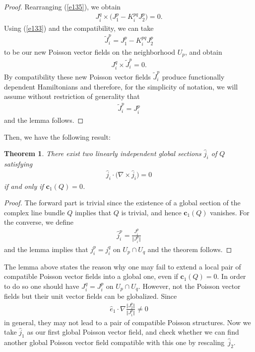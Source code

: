 \documentclass[pdftex]{sigma}
\numberwithin{equation}{section}
\newtheorem{Theorem}{Theorem}[section]
\begin{document}
\begin{proof}
Rearranging (\ref{e135}), we obtain
\begin{gather*}
J_{i}^{q}\times \big( J_{1}^{p}-K_{i}^{pq}J_{2}^{p}\big) =0.
\end{gather*}
Using (\ref{e133}) and the compatibility, we can take
\begin{gather*}
\widetilde{J}_{i}^{p}=J_{1}^{p}-K_{i}^{pq}J_{2}^{p}
\end{gather*}
to be our new Poisson vector f\/ields on the neighborhood $U_{p}$, and obtain
\begin{gather*}
J_{i}^{q}\times \widetilde{J}_{i}^{p}=0.
\end{gather*}
By compatibility these new Poisson vector f\/ields $\widetilde{J}_{i}^{p}$ produce functionally dependent Hamilto\-nians and therefore, for the simplicity of notation, we will assume without restriction of generality that
\begin{gather*}
\widetilde{J}_{i}^{p}=J_{i}^{p}
\end{gather*}
and the lemma follows.
\end{proof}

Then, we have the following result:

\begin{Theorem}\label{theorem3}
There exist two linearly independent global sections $\widehat{j}_{i}$ of $Q$ satisfying
\begin{gather}
\widehat{j}_{i}\cdot \big( \nabla \times \widehat{j}_{i}\big) =0\label{e140}
\end{gather}
if and only if $\boldsymbol{c}_{1}(Q) =0$.
\end{Theorem}

\begin{proof}
The forward part is trivial since the existence of a global section of the complex line bundle $Q$ implies that $Q$ is trivial, and hence $\boldsymbol{c}_{1}(Q) $ vanishes. For the converse, we def\/ine
\begin{gather*}
\widehat{j}_{i}^{p}=\frac{J_{i}^{p}}{\big\Vert J_{i}^{p}\big\Vert }
\end{gather*}
and the lemma implies that $j_{i}^{p}=j_{i}^{q}$ on $U_{p}\cap U_{q}$ and the theorem follows.
\end{proof}

The lemma above states the reason why one may fail to extend a local pair of compatible Poisson vector f\/ields into a global one, even if $\boldsymbol{c}_{1}(Q) =0$. In order to do so one should have $J_{i}^{q}=J_{i}^{p}$ on $U_{p}\cap U_{q}$. However, not the Poisson vector f\/ields but their unit vector f\/ields can be globalized. Since
\begin{gather*}
\widehat{e}_{1}\cdot \nabla \frac{\big\Vert J_{2}^{p}\big\Vert }{\big\Vert J_{1}^{p}\big\Vert }\neq 0 %
\end{gather*}
in general, they may not lead to a pair of compatible Poisson structures. Now we take $\widehat{j}_{1}$ as our f\/irst global Poisson vector f\/ield, and check whether we can f\/ind another global Poisson vector f\/ield compatible with this one by rescaling~$\widehat{j}_{2}$.
\end{document}
